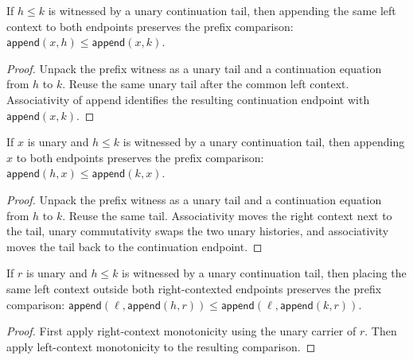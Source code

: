 \begin{theorem}
\label{thm:preorder-prefix-left-context-monotonicity}
If \(h\le k\) is witnessed by a unary continuation tail, then appending the
same left context to both endpoints preserves the prefix comparison:
\(\mathsf{append}(x,h)\le\mathsf{append}(x,k)\).
\end{theorem}
\begin{proof}
Unpack the prefix witness as a unary tail and a continuation equation from
\(h\) to \(k\). Reuse the same unary tail after the common left context.
Associativity of append identifies the resulting continuation endpoint with
\(\mathsf{append}(x,k)\).
\end{proof}

\begin{theorem}
\label{thm:preorder-prefix-right-context-monotonicity}
If \(x\) is unary and \(h\le k\) is witnessed by a unary continuation tail, then appending \(x\) to both endpoints preserves the prefix comparison:
\(\mathsf{append}(h,x)\le\mathsf{append}(k,x)\).
\end{theorem}
\begin{proof}
Unpack the prefix witness as a unary tail and a continuation equation from \(h\) to \(k\). Reuse the same tail. Associativity moves the right context next to the tail, unary commutativity swaps the two unary histories, and associativity moves the tail back to the continuation endpoint.
\end{proof}

\begin{theorem}
\label{thm:preorder-prefix-append-both-context}
If \(r\) is unary and \(h\le k\) is witnessed by a unary continuation tail, then
placing the same left context outside both right-contexted endpoints preserves
the prefix comparison:
\(\mathsf{append}(\ell,\mathsf{append}(h,r))\le
\mathsf{append}(\ell,\mathsf{append}(k,r))\).
\end{theorem}
\begin{proof}
First apply right-context monotonicity using the unary carrier of \(r\). Then
apply left-context monotonicity to the resulting comparison.
\end{proof}

